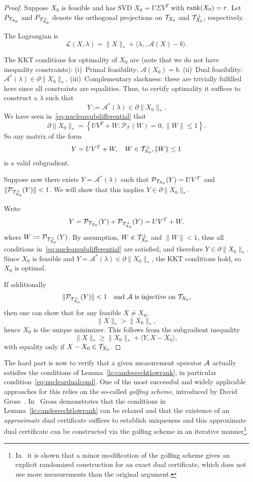 \begin{proof}
Suppose $X_0$ is feasible and has SVD
$X_0 = U \Sigma V^T$ with $\operatorname{rank}(X_0)=r$.
Let $P_{{{\mathcal T}_{X_0}}}$ and $P_{{{\mathcal T}^{\perp}_{X_0}}}$  
denote the  orthogonal projections on $\mathcal{T}_{X_0}$ and
${{\mathcal T}^{\perp}_{X_0}}$, respectively.

The Lagrangian is
$$
\mathcal L(X,\lambda)
= \|X\|_* + \langle \lambda,, \mathcal A(X)-b\rangle.
$$

The KKT conditions for optimality of $X_0$ are (note that we do not have inequality constraints):
(i)~Primal feasibility: $\mathcal A(X_0)=b$.
(ii)~Dual feasibility: $\mathcal A^*(\lambda) \in \partial\|X_0\|_*$.
(iii)~Complementary slackness: these are trivially fulfilled here since all constraints are equalities.
Thus, to certify optimality it suffices to construct a $\lambda$ such that
$$
Y := \mathcal A^*(\lambda) \in \partial\|X_0\|_*.
$$
We have seen in~\eqref{eq:nuclearsubdifferential}  that 
$$
\partial \|X_0\|_* =
\left\{UV^T + W : \mathcal P_{\mathcal T}(W)=0, \|W\|\le 1
\right\}.
$$
So any matrix of the form
$$
Y = UV^T + W,
\quad
W\in {{\mathcal T}^{\perp}_{X_0}}, \|W\|\le 1
$$
is a valid subgradient.


Suppose now there exists $Y=\mathcal A^*(\lambda)$ such that $\mathcal P_{{{\mathcal T}_{X_0}}}(Y) = UV^T$ and 
$\|\mathcal P_{{{\mathcal T}^{\perp}_{X_0}}}(Y)\| < 1$.
We will show that this implies $Y\in\partial\|X_0\|_*$.


Write
$$Y = {\mathcal P}_{{{\mathcal T}_{X_0}}}(Y) + {\mathcal P}_{{{\mathcal T}^{\perp}_{X_0}}}(Y)
= UV^T + W,
$$
where $W := \mathcal P_{{{\mathcal T}^{\perp}_{X_0}}}(Y)$.
By assumption, $W \in {{\mathcal T}^{\perp}_{X_0}}$ and $\|W\|< 1$, thus 
all conditions in~\eqref{eq:nuclearsubdifferential} are satisfied, and therefore
$Y \in \partial\|X_0\|_*$.
Since $X_0$ is feasible and
$Y=\mathcal A^*(\lambda)\in\partial\|X_0\|_*$,
the KKT conditions hold, so $X_0$ is optimal.


If additionally
$$
\|\mathcal P_{{{\mathcal T}^{\perp}_{X_0}}}(Y)\| < 1
\quad\text{and ${\mathcal A}$ is injective on ${{\mathcal T}_{X_0}}$},
$$
then one can show that for any feasible $X\neq X_0$,
$$
\|X\|_* > \|X_0\|_*,
$$
hence $X_0$ is the unique minimizer.
This follows from the subgradient inequality
$$
\|X\|_* \ge \|X_0\|_* + \langle Y, X-X_0\rangle,
$$
with equality only if $X-X_0\in {{\mathcal T}_{X_0}}$. 

\end{proof}


The hard part is now to verify that a given measurement operator ${\mathcal A}$ actually  satisfies the conditions of Lemma~\ref{le:candesrechtlowrank}, in particular condition~\eqref{eq:nucleardualcond}.
One of the most successful and widely applicable approaches for this relies on the so-called {\em golfing scheme}, introduced by
David Gross~\cite{gross2011recovering}. 
In~\cite{gross2011recovering} Gross demonstrates that the conditions in Lemma~\ref{le:candesrechtlowrank} can be relaxed and that the
existence of an {\em approximate} dual certificate suffices to establish uniqueness
and this approximate dual certificate can be constructed via the golfing scheme in an iterative manner\footnote{In~\cite{fuchs2022proof} it is shown that a minor modification of the golfing scheme gives an explicit randomized construction for an exact dual certificate, which does not use more measurements than the original argument.}.

